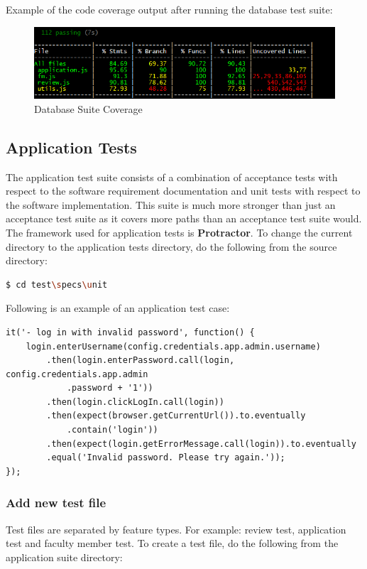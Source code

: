 \documentclass[fontsize=12pt,paper=letter,twoside]{scrartcl}
\begin{document}
\bigskip
\noindent Example of the code coverage output after running the database test suite:

\begin{figure}[!htb]
\begin{center}
\includegraphics[width=.99\textwidth]{images/database/coverage.png}
\end{center}
\caption{Database Suite Coverage}
\label{fig:db/coverage}
\end{figure}

\newpage
\subsection{Application Tests}
The application test suite consists of a combination of acceptance tests with respect to the software requirement documentation and unit tests with respect to the software implementation. This suite is much more stronger than just an acceptance test suite as it covers more paths than an acceptance test suite would. The framework used for application tests is \textbf{Protractor}. To change the current directory to the application tests directory, do the following from the source directory:\\

\begin{lstlisting}[language=bash]
  $ cd test\specs\unit
\end{lstlisting}

\bigskip
\noindent Following is an example of an application test case:\\

\begin{lstlisting}
it('- log in with invalid password', function() {
	login.enterUsername(config.credentials.app.admin.username)
		.then(login.enterPassword.call(login, config.credentials.app.admin
			.password + '1'))
		.then(login.clickLogIn.call(login))
		.then(expect(browser.getCurrentUrl()).to.eventually
			.contain('login'))
		.then(expect(login.getErrorMessage.call(login)).to.eventually
		.equal('Invalid password. Please try again.'));
});
\end{lstlisting}

\newpage
\subsubsection{Add new test file}
Test files are separated by feature types. For example: review test, application test and faculty member test. To create a test file, do the following from the application suite directory:
\end{document}
